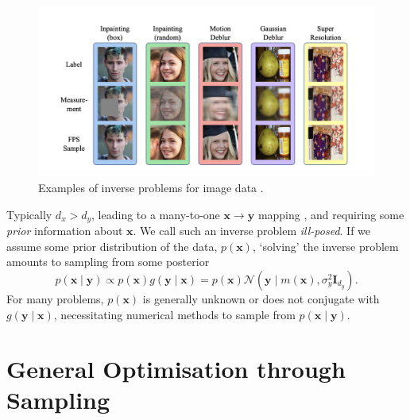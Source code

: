 \begin{figure}[htbp]
    \centering
    \includegraphics[width=1\textwidth]{assets/inverse_problems.png}
    \caption{Examples of inverse problems for image data \parencite{douDiffusionPosteriorSampling2023}.}
    \label{fig:inverse-problems}
\end{figure}

\begin{remark} \label{rem:bayes-inv}
    Typically $d_x > d_y$, leading to a many-to-one $\mathbf{x} \rightarrow \mathbf{y}$ mapping
    \parencite{chungDiffusionPosteriorSampling2022}, and requiring some \emph{prior} information
    about $\mathbf{x}$. We call such an inverse problem \emph{ill-posed}. If we assume some prior
    distribution of the data, $p(\mathbf{x})$, `solving' the inverse problem amounts to sampling
    from some posterior
    \begin{equation*}
        p(\mathbf{x} \mid \mathbf{y}) \propto p(\mathbf{x})g(\mathbf{y} \mid \mathbf{x})
        = p(\mathbf{x})\mathcal{N}\left(\mathbf{y} \mid m(\mathbf{x}), \sigma^2_y\mathbf{I}_{d_y}\right).
    \end{equation*}
    For many problems, $p(\mathbf{x})$ is generally unknown or does not conjugate with
    $g(\mathbf{y} \mid \mathbf{x})$, necessitating numerical methods to sample from
    $p(\mathbf{x} \mid \mathbf{y})$.
\end{remark}

\section{General Optimisation through Sampling}\label{sec:general-optimisation}

